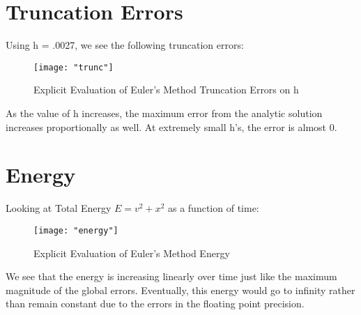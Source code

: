 \documentclass{article}
\begin{document}
\section{Truncation Errors}
Using h = .0027, we see the following truncation errors:
\begin{figure}[h!]
	\centering
	\texttt{[image: "trunc"]}
	\caption{Explicit Evaluation of Euler's Method Truncation Errors on h}
\end{figure} 
\FloatBarrier

As the value of h increases, the maximum error from the analytic solution increases proportionally as well. At extremely small h's, the error is almost 0.

\section{Energy}
Looking at Total Energy $E = v^2 + x^2$ as a function of time:
\begin{figure}[h!]
	\centering
	\texttt{[image: "energy"]}
	\caption{Explicit Evaluation of Euler's Method Energy}
\end{figure} 
\FloatBarrier
We see that the energy is increasing linearly over time just like the maximum magnitude of the global errors. Eventually, this energy would go to 
infinity rather than remain constant due to the errors in the floating point precision.
\end{document}
